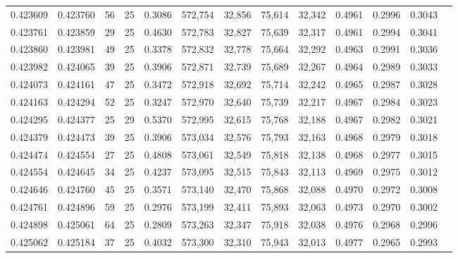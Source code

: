 \begin{tabular}{rrrrrrrrrrrrr}
0.423609 & 0.423760 &    56 &  25 &                                     0.3086 & 572,754 &  32,856 &  75,614 &  32,342 & 0.4961 & 0.2996 & 0.3043 \\
0.423761 & 0.423859 &    29 &  25 &                                     0.4630 & 572,783 &  32,827 &  75,639 &  32,317 & 0.4961 & 0.2994 & 0.3041 \\
0.423860 & 0.423981 &    49 &  25 &                                     0.3378 & 572,832 &  32,778 &  75,664 &  32,292 & 0.4963 & 0.2991 & 0.3036 \\
0.423982 & 0.424065 &    39 &  25 &                                     0.3906 & 572,871 &  32,739 &  75,689 &  32,267 & 0.4964 & 0.2989 & 0.3033 \\
0.424073 & 0.424161 &    47 &  25 &                                     0.3472 & 572,918 &  32,692 &  75,714 &  32,242 & 0.4965 & 0.2987 & 0.3028 \\
0.424163 & 0.424294 &    52 &  25 &                                     0.3247 & 572,970 &  32,640 &  75,739 &  32,217 & 0.4967 & 0.2984 & 0.3023 \\
0.424295 & 0.424377 &    25 &  29 &                                     0.5370 & 572,995 &  32,615 &  75,768 &  32,188 & 0.4967 & 0.2982 & 0.3021 \\
0.424379 & 0.424473 &    39 &  25 &                                     0.3906 & 573,034 &  32,576 &  75,793 &  32,163 & 0.4968 & 0.2979 & 0.3018 \\
0.424474 & 0.424554 &    27 &  25 &                                     0.4808 & 573,061 &  32,549 &  75,818 &  32,138 & 0.4968 & 0.2977 & 0.3015 \\
0.424554 & 0.424645 &    34 &  25 &                                     0.4237 & 573,095 &  32,515 &  75,843 &  32,113 & 0.4969 & 0.2975 & 0.3012 \\
0.424646 & 0.424760 &    45 &  25 &                                     0.3571 & 573,140 &  32,470 &  75,868 &  32,088 & 0.4970 & 0.2972 & 0.3008 \\
0.424761 & 0.424896 &    59 &  25 &                                     0.2976 & 573,199 &  32,411 &  75,893 &  32,063 & 0.4973 & 0.2970 & 0.3002 \\
0.424898 & 0.425061 &    64 &  25 &                                     0.2809 & 573,263 &  32,347 &  75,918 &  32,038 & 0.4976 & 0.2968 & 0.2996 \\
0.425062 & 0.425184 &    37 &  25 &                                     0.4032 & 573,300 &  32,310 &  75,943 &  32,013 & 0.4977 & 0.2965 & 0.2993 \\

\end{tabular}
